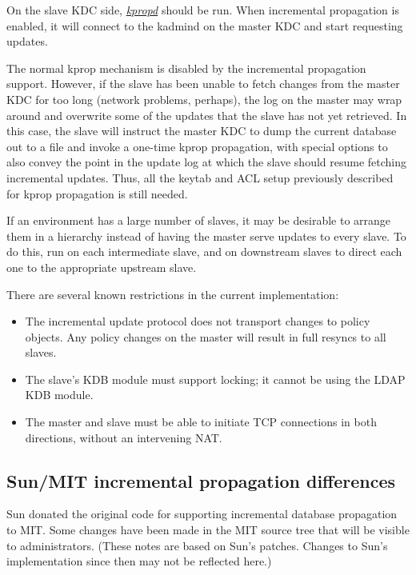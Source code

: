 \documentclass[letterpaper,10pt,english]{sphinxmanual}
\begin{document}
On the slave KDC side, {\hyperref[admin/admin_commands/kpropd:kpropd-8]{\emph{kpropd}}} should be run.  When
incremental propagation is enabled, it will connect to the kadmind on
the master KDC and start requesting updates.

The normal kprop mechanism is disabled by the incremental propagation
support.  However, if the slave has been unable to fetch changes from
the master KDC for too long (network problems, perhaps), the log on
the master may wrap around and overwrite some of the updates that the
slave has not yet retrieved.  In this case, the slave will instruct
the master KDC to dump the current database out to a file and invoke a
one-time kprop propagation, with special options to also convey the
point in the update log at which the slave should resume fetching
incremental updates.  Thus, all the keytab and ACL setup previously
described for kprop propagation is still needed.

If an environment has a large number of slaves, it may be desirable to
arrange them in a hierarchy instead of having the master serve updates
to every slave.  To do this, run  on each
intermediate slave, and  on downstream
slaves to direct each one to the appropriate upstream slave.

There are several known restrictions in the current implementation:
\begin{itemize}
\item {} 
The incremental update protocol does not transport changes to policy
objects.  Any policy changes on the master will result in full
resyncs to all slaves.

\item {} 
The slave's KDB module must support locking; it cannot be using the
LDAP KDB module.

\item {} 
The master and slave must be able to initiate TCP connections in
both directions, without an intervening NAT.

\end{itemize}


\subsection{Sun/MIT incremental propagation differences}
\label{admin/database:sun-mit-incremental-propagation-differences}
Sun donated the original code for supporting incremental database
propagation to MIT.  Some changes have been made in the MIT source
tree that will be visible to administrators.  (These notes are based
on Sun's patches.  Changes to Sun's implementation since then may not
be reflected here.)
\end{document}

